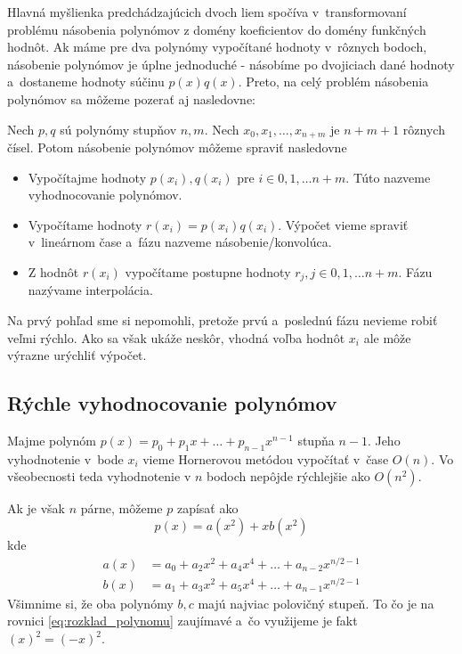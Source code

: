 Hlavná myšlienka predchádzajúcich dvoch liem spočíva v~transformovaní
problému násobenia polynómov z domény koeficientov do domény funkčných
hodnôt. Ak máme pre dva polynómy vypočítané hodnoty v~rôznych bodoch, násobenie
polynómov je úplne jednoduché - násobíme po dvojiciach dané hodnoty 
a~dostaneme hodnoty súčinu $p(x)q(x)$. Preto, na celý problém násobenia
polynómov sa môžeme pozerať aj nasledovne:

Nech $p,q$ sú polynómy stupňov $n,m$. Nech $x_0,x_1,\dots, x_{n+m}$ je
$n+m+1$ rôznych čísel. Potom násobenie polynómov môžeme spraviť
nasledovne
\begin{itemize}
  \item Vypočítajme hodnoty $p(x_i), q(x_i)$ pre $i\in0,1,\dots n+m$.
  Túto nazveme vyhodnocovanie polynómov.
  \item Vypočítame hodnoty $r(x_i) = p(x_i) q(x_i)$. Výpočet vieme
  spraviť v~lineárnom čase a~fázu nazveme násobenie/konvolúca.
  \item Z hodnôt $r(x_i)$ vypočítame postupne hodnoty $r_j, j\in
  0,1,\dots n+m$. Fázu nazývame interpolácia.
\end{itemize}

Na prvý pohľad sme si nepomohli, pretože prvú a~poslednú fázu nevieme
robiť veľmi rýchlo. Ako sa však ukáže neskôr, vhodná voľba hodnôt
$x_i$ ale môže výrazne urýchliť výpočet.

\subsection{Rýchle vyhodnocovanie polynómov}

Majme polynóm $p(x)=p_0 + p_1 x + \dots + p_{n-1} x^{n-1}$ stupňa $n-1$.
Jeho vyhodnotenie v~bode $x_i$ vieme
Hornerovou metódou vypočítať v~čase $O(n)$. Vo všeobecnosti teda
vyhodnotenie v $n$ bodoch nepôjde rýchlejšie ako $O(n^2)$.

Ak je však $n$ párne, môžeme $p$ zapísať ako
\begin{equation}
    p(x) = a(x^2) + x b(x^2)
    \label{eq:rozklad_polynomu}
\end{equation}
kde
\begin{align*}
    a(x) &= a_0 + a_2 x^2 + a_4 x^4 + \dots + a_{n-2} x^{n/2-1} \\
    b(x) &= a_1 + a_3 x^2 + a_5 x^4 + \dots + a_{n-1} x^{n/2-1}
\end{align*}
Všimnime si, že oba polynómy $b,c$ majú najviac polovičný
stupeň.
To čo je na rovnici \eqref{eq:rozklad_polynomu} zaujímavé a~čo využijeme
je fakt $(x)^2 = (-x)^2$.

